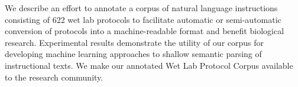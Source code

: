 We describe an effort to annotate a corpus of natural language instructions consisting of 622 wet lab protocols to facilitate automatic or semi-automatic conversion of protocols into a machine-readable format and benefit biological research. Experimental results demonstrate the utility of our corpus for developing machine learning approaches to shallow semantic parsing of instructional texts. We make our annotated Wet Lab Protocol Corpus available to the research community.
